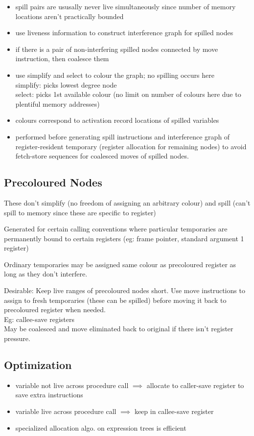 \documentclass[8pt]{extarticle}
\begin{document}
\begin{multicols*}{2}
  \begin{itemize}
  \item spill pairs are ususally never live simultaneously since number of memory locations aren't practically bounded
  \item use liveness information to construct interference graph for spilled nodes
  \item if there is a pair of non-interfering spilled nodes connected by move instruction, then coalesce them
  \item use simplify and select to colour the graph; no spilling occurs here\\
    simplify: picks lowest degree node\\
    select: picks 1st available  colour (no limit on number of colours here due to plentiful memory addresses)
  \item colours correspond to activation record locations of spilled variables
  \item performed before generating spill instructions and interference graph of register-resident temporary (register allocation for remaining nodes) to avoid fetch-store sequences for coalesced moves of spilled nodes.
  \end{itemize}

  
  \subsection{Precoloured Nodes}

  These don't simplify (no freedom of assigning an arbitrary colour) and spill (can't spill to memory since these are specific to register)

  Generated for certain calling conventions where particular temporaries are permanently bound to certain registers (eg: frame pointer, standard argument 1 register)

  Ordinary temporaries may be assigned same colour as precoloured register as long as they don't interfere.
  
  Desirable: Keep live ranges of precoloured nodes short. Use move instructions to assign to fresh temporaries (these can be spilled) before moving it back to precoloured register when needed.\\
  Eg: callee-save registers\\
  May be coalesced and move eliminated back to original if there isn't register pressure.

  \subsection{Optimization}
  \begin{itemize}
  \item variable not live across procedure call $\implies$ allocate to caller-save register to save extra instructions
  \item variable live across procedure call $\implies$ keep in callee-save register
  \item specialized allocation algo. on expression trees is efficient
  \end{itemize}


\end{multicols*}
\end{document}
